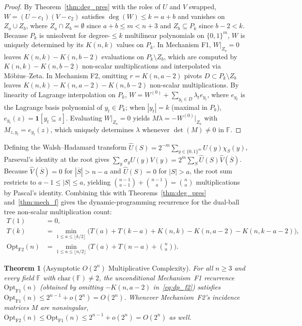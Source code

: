 \documentclass[11pt,a4paper]{article}
\newtheorem{theorem}{Theorem}[section]
\begin{document}
\begin{proof}
By Theorem~\ref{thm:deg_pres} with the roles of $U$ and $V$ swapped, $W = (U - c_1)(V - c_2)$ satisfies $\deg(W) \le k = a + b$ and vanishes on $Z_a \cup Z_b$, where $Z_a \cap Z_b = \emptyset$ since $a + b \le m < n + 3$ and $Z_b \subseteq P_k$ since $b - 2 < k$. Because $P_k$ is unisolvent for degree-$\le k$ multilinear polynomials on $\{0,1\}^m$, $W$ is uniquely determined by its $K(n, k)$ values on $P_k$. In Mechanism F1, $W|_{Z_b} = 0$ leaves $K(n, k) - K(n, b-2)$ evaluations on $P_k \setminus Z_b$, which are computed by $K(n, k) - K(n, b-2)$ non-scalar multiplications and interpolated via M\"obius--Zeta. In Mechanism F2, omitting $r = K(n, a-2)$ pivots $D \subset P_k \setminus Z_b$ leaves $K(n, k) - K(n, a-2) - K(n, b-2)$ non-scalar multiplications. By linearity of Lagrange interpolation on $P_k$, $W = W^{(0)} + \sum_{y_t \in D} \lambda_t e_{y_t}$, where $e_{y_t}$ is the Lagrange basis polynomial of $y_t \in P_k$; when $|y_t| = k$ (maximal in $P_k$), $e_{y_t}(z) = \mathbf{1}[y_t \subseteq z]$. Evaluating $W|_{Z_a} = 0$ yields $M \lambda = -W^{(0)}|_{Z_a}$ with $M_{z, y_t} = e_{y_t}(z)$, which uniquely determines $\lambda$ whenever $\det(M) \neq 0$ in $\mathbb{F}$.
\end{proof}

Defining the Walsh--Hadamard transform $\widehat{U}(S) = 2^{-m} \sum_{y \in \{0,1\}^m} U(y) \chi_S(y)$, Parseval's identity at the root gives $\sum_{y} \sigma_y U(y) V(y) = 2^m \sum_{S} \widehat{U}(S)\widehat{V}(\overline{S})$. Because $\widehat{V}(\overline{S}) = 0$ for $|\overline{S}| > n - a$ and $\widehat{U}(S) = 0$ for $|S| > a$, the root sum restricts to $a - 1 \le |S| \le a$, yielding $\binom{n-1}{a-1} + \binom{n-1}{a} = \binom{n}{a}$ multiplications by Pascal's identity. Combining this with Theorems~\ref{thm:deg_pres} and~\ref{thm:mech_f} gives the dynamic-programming recurrence for the dual-ball tree non-scalar multiplication count:
\begin{align}
  T(1) &= 0, \\
  T(k) &= \min_{1 \le a \le \lfloor k/2 \rfloor} \Big( T(a) + T(k-a) + K(n,k) - K(n,a-2) - K(n,k-a-2) \Big), \label{eq:dp_f2} \\
  \mathrm{Opt}_{\mathrm{F2}}(n) &= \min_{1 \le a \le \lfloor n/2 \rfloor} \Big( T(a) + T(n-a) + \binom{n}{a} \Big).
\end{align}

\begin{theorem}[Asymptotic $O(2^n)$ Multiplicative Complexity]
\label{thm:asymptotic_2n}
For all $n \ge 3$ and every field $\mathbb{F}$ with $\mathrm{char}(\mathbb{F}) \neq 2$, the unconditional Mechanism~F1 recurrence $\mathrm{Opt}_{\mathrm{F1}}(n)$ (obtained by omitting $-K(n,a-2)$ in~\eqref{eq:dp_f2}) satisfies $\mathrm{Opt}_{\mathrm{F1}}(n) \le 2^{n-1} + o(2^n) = O(2^n)$. Whenever Mechanism~F2's incidence matrices $M$ are nonsingular, $\mathrm{Opt}_{\mathrm{F2}}(n) \le \mathrm{Opt}_{\mathrm{F1}}(n) \le 2^{n-1} + o(2^n) = O(2^n)$ as well.
\end{theorem}
\end{document}
